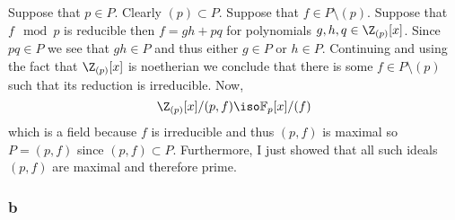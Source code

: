 \documentclass[12pt]{article}
\renewcommand{\F}{\mathbb{F}}
\begin{document}
Suppose that $p \in P$. Clearly $(p) \subset P$. Suppose that $f \in P \setminus (p)$. Suppose that $f \mod p$ is reducible then $f = gh + p q$ for polynomials $g,h,q \in \Z_{(p)}[x]$. Since $p q \in P$ we see that $gh \in P$ and thus either $g \in P$ or $h \in P$. Continuing and using the fact that $\Z_{(p)}[x]$ is noetherian we conclude that there is some $f \in P \setminus (p)$ such that its reduction is irreducible. Now,
\[ \Z_{(p)}[x] / (p, f) \iso \F_p[x]/(f) \]
which is a field because $f$ is irreducible and thus $(p, f)$ is maximal so $P = (p, f)$ since $(p, f) \subset P$. Furthermore, I just showed that all such ideals $(p, f)$ are maximal and therefore prime.

\subsubsection{b}
\end{document}
